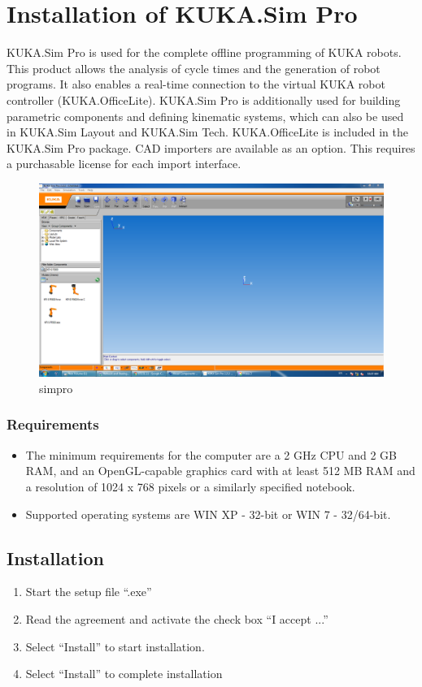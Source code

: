 \section{Installation of KUKA.Sim Pro}
KUKA.Sim Pro is used for the complete offline programming of KUKA robots. This product allows the analysis of cycle times and the generation of robot programs. It also enables a real-time connection to the virtual KUKA robot controller (KUKA.OfficeLite). KUKA.Sim Pro is additionally used for building parametric components and defining kinematic systems, which can also be used in KUKA.Sim Layout and KUKA.Sim Tech. KUKA.OfficeLite is included in the KUKA.Sim Pro package. CAD importers are available as an option. This requires a purchasable license for each import interface. 
	\begin{figure}[H]
    \centering
    \includegraphics[width=\textwidth]{figures/simpro1}
    \caption{simpro}
    \label{fig:simpro1}
\end{figure}
\subsubsection*{Requirements}
	\begin{itemize}
	\item The minimum requirements for the computer are a 2 GHz CPU and 2 GB RAM, and an OpenGL-capable graphics card with at least 512 MB RAM and a resolution of 1024 x 768 pixels or a similarly specified notebook.
	\item Supported operating systems are WIN XP - 32-bit or WIN 7 - 32/64-bit.
\end{itemize}

\subsection{Installation}
	\begin{enumerate}
		\item Start the setup file “.exe”
		\item Read the agreement and activate the check box “I accept ...”
		\item Select “Install” to start installation.
		\item Select “Install” to complete installation
	\end{enumerate}

